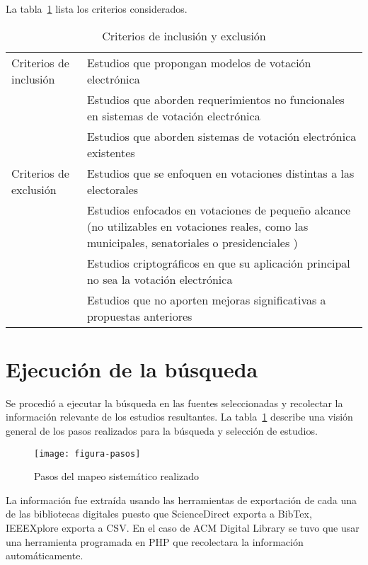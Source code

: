 La tabla~\ref{tab:criterios} lista los criterios considerados.

\begin{table}
\centering
\caption{Criterios de inclusión y exclusión}
\label{tab:criterios}
\begin{tabularx}{\textwidth}{ p{4cm} X } 
\toprule[1.5pt]
	Criterios de inclusión		&	Estudios que propongan modelos de votación electrónica	\\ 
							&	Estudios que aborden requerimientos no funcionales en sistemas de votación electrónica 	\\ 
							&	Estudios que aborden sistemas de votación electrónica existentes 	\\ \hline
	Criterios de exclusión		&	Estudios que se enfoquen en votaciones distintas a las electorales \\ 
							&	Estudios enfocados en votaciones de pequeño alcance (no utilizables 
								en votaciones reales, como las municipales, senatoriales o presidenciales ) \\ 	
							&	Estudios criptográficos en que su aplicación principal no sea la votación electrónica \\
							&	Estudios que no aporten mejoras significativas a propuestas anteriores \\
					
\bottomrule[1.25pt]
\end{tabularx}
\end{table}
\bigskip

\section{Ejecución de la búsqueda}

\setlength{\parindent}{1cm}
\setlength{\parskip}{5pt}

Se procedió a ejecutar la búsqueda en las fuentes seleccionadas 
y recolectar la información relevante de los estudios resultantes. 
La tabla~\ref{fig:pasos} describe una visión general de los pasos
realizados para la búsqueda y selección de estudios.

\begin{figure}[h!]
	\centering
	\texttt{[image: figura-pasos]}
	\caption{Pasos del mapeo sistemático realizado}
	\label{fig:pasos}
\end{figure}
\bigskip

La información fue extraída usando las herramientas de exportación de cada 
una de las bibliotecas digitales puesto
que ScienceDirect exporta a BibTex, IEEEXplore exporta a CSV. 
En el caso de ACM Digital Library se tuvo que usar una herramienta 
programada en PHP que recolectara la información automáticamente.

